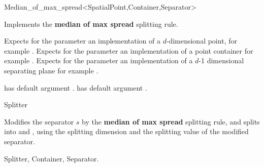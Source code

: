 

\begin{ccRefFunctionObjectClass}{Median_of_max_spread<SpatialPoint,Container,Separator>}  %

\ccDefinition
Implements the {\bf median of max spread} splitting rule.

\ccParameters

Expects for the parameter  an implementation of a $d$-dimensional point,
for example . Expects for the parameter  an implementation
of a point container for example .
Expects for the parameter  an implementation of a $d$-1 dimensional 
separating plane for example .

 has default argument .
 has default argument . 



\ccIsModel

Splitter

\ccTypes




\ccOperations

{Modifies the separator $s$ by the {\bf median of max spread} splitting rule, 
and splits  into  and ,
using the splitting dimension and the splitting value of the modified separator.
}

\ccSeeAlso

Splitter, Container, Separator.


\end{ccRefFunctionObjectClass}


